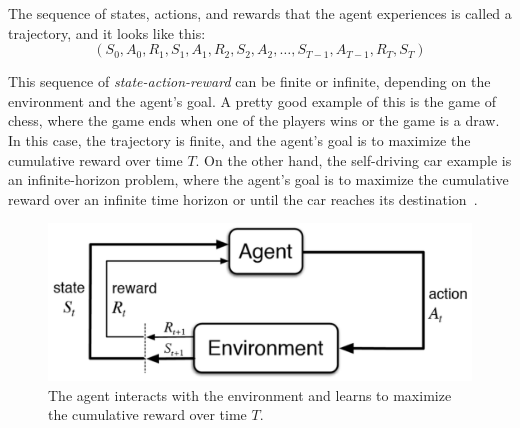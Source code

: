 \documentclass[../xlapes02]{subfiles}
\begin{document}
    The sequence of states, actions, and rewards that the agent experiences is called a trajectory, and it looks like this:
    \begin{equation}
        \label{eq:trajectory}
        (S_0, A_0, R_1, S_1, A_1, R_2, S_2, A_2, \dots, S_{T-1}, A_{T-1}, R_T, S_T)
    \end{equation}

    This sequence of \emph{state-action-reward} can be finite or infinite, depending on the environment and the agent's goal. A pretty good example of this is the game of chess, where the game ends when one of the players wins or the game is a draw. In this case, the trajectory is finite, and the agent's goal is to maximize the cumulative reward over time $T$. On the other hand, the self-driving car example is an infinite-horizon problem, where the agent's goal is to maximize the cumulative reward over an infinite time horizon or until the car reaches its destination~\cite{FITMT25127}.

    \begin{figure}[h]
        \includegraphics[width=0.7\linewidth]{image/agent-environment}
        \centering
        \caption{The agent interacts with the environment and learns to maximize the cumulative reward over time $T$.}
        \label{fig:rl-introduction}
    \end{figure}
\end{document}
